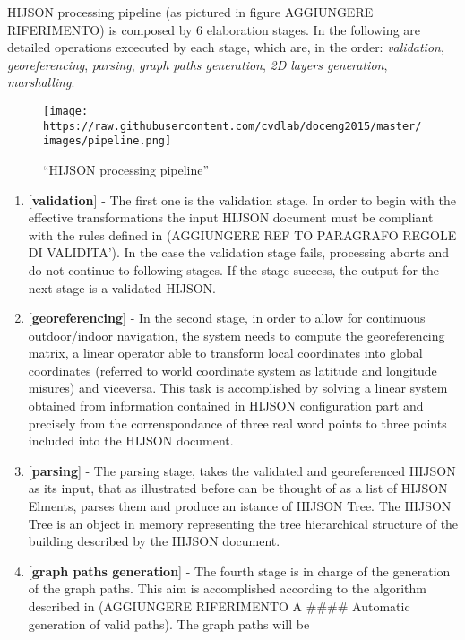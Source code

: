\documentclass[]{article}
\begin{document}
HIJSON processing pipeline (as pictured in figure AGGIUNGERE
RIFERIMENTO) is composed by 6 elaboration stages. In the following are
detailed operations excecuted by each stage, which are, in the order:
\emph{validation}, \emph{georeferencing}, \emph{parsing}, \emph{graph
paths generation}, \emph{2D layers generation}, \emph{marshalling}.

\begin{figure}[htbp]
\centering
\texttt{[image: https://raw.githubusercontent.com/cvdlab/doceng2015/master/images/pipeline.png]}
\caption{``HIJSON processing pipeline''}
\end{figure}

\begin{enumerate}
\def\labelenumi{\arabic{enumi}.}
\itemsep1pt\parskip0pt
\item
  {[}\textbf{validation}{]} - The first one is the validation stage. In
  order to begin with the effective transformations the input HIJSON
  document must be compliant with the rules defined in (AGGIUNGERE REF
  TO PARAGRAFO REGOLE DI VALIDITA'). In the case the validation stage
  fails, processing aborts and do not continue to following stages. If
  the stage success, the output for the next stage is a validated
  HIJSON.
\item
  {[}\textbf{georeferencing}{]} - In the second stage, in order to allow
  for continuous outdoor/indoor navigation, the system needs to compute
  the georeferencing matrix, a linear operator able to transform local
  coordinates into global coordinates (referred to world coordinate
  system as latitude and longitude misures) and viceversa. This task is
  accomplished by solving a linear system obtained from information
  contained in HIJSON configuration part and precisely from the
  correnspondance of three real word points to three points included
  into the HIJSON document.
\item
  {[}\textbf{parsing}{]} - The parsing stage, takes the validated and
  georeferenced HIJSON as its input, that as illustrated before can be
  thought of as a list of HIJSON Elments, parses them and produce an
  istance of HIJSON Tree. The HIJSON Tree is an object in memory
  representing the tree hierarchical structure of the building described
  by the HIJSON document.
\item
  {[}\textbf{graph paths generation}{]} - The fourth stage is in charge
  of the generation of the graph paths. This aim is accomplished
  according to the algorithm described in (AGGIUNGERE RIFERIMENTO A
  \#\#\#\# Automatic generation of valid paths). The graph paths will be

\end{enumerate}
\end{document}
